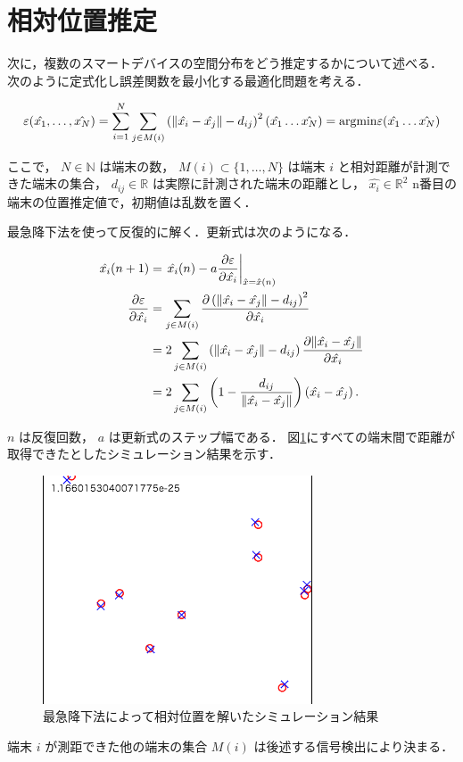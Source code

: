 

\section{相対位置推定}


次に，複数のスマートデバイスの空間分布をどう推定するかについて述べる．
次のように定式化し誤差関数を最小化する最適化問題を考える．

$$
\varepsilon(\hat{x_1}, \dots, \hat{x_N}) = \sum_{i=1}^N \sum_{j\in M(i)} \left( \| \hat{ x_i } - \hat{ x_j } \| - d_{ij} \right)^2 \\
(\hat{x_1} \dots \hat{x_N}) = \mathrm{argmin} \varepsilon(\hat{x_1} \dots \hat{x_N})
$$

ここで，
$N \in \mathbb{N}$ は端末の数，
$M(i) \subset \{1,\dots,N\}$ は端末 $i$ と相対距離が計測できた端末の集合，
$d_{ij} \in \mathbb{R}$ は実際に計測された端末の距離とし，
$\hat{ x_i } \in \mathbb{R}^2$ n番目の端末の位置推定値で，初期値は乱数を置く．

最急降下法を使って反復的に解く．更新式は次のようになる．

$$\begin{aligned}
\hat{x_i} (n + 1) & = \left. \hat{x_i} (n) - a \frac{\partial \varepsilon}{\partial \hat{x_i}} \right|_{\hat{x} = \hat{x}(n)} \\
\frac{\partial \varepsilon}{\partial \hat{x_i}}
&= \sum_{j\in M(i)} \frac{\partial \left( \|\hat{ x_i } - \hat{ x_j }\| - d_{ij} \right)^2}{\partial \hat{x_i}} \notag\\
&= 2 \sum_{j\in M(i)} \left( \| \hat{x_i} - \hat{x_j} \| - d_{ij} \right) \frac{\partial \| \hat{x_i} - \hat{x_j} \|}{\partial \hat{x_i}} \notag\\
&= 2 \sum_{j\in M(i)} \left( 1 - \frac{d_{ij}}{\| \hat{x_i} - \hat{x_j} \|} \right) \left( \hat{x_i} - \hat{x_j} \right).
\end{aligned}$$

$n$ は反復回数， $a$ は更新式のステップ幅である．
図\ref{fig:relpo_s}にすべての端末間で距離が取得できたとしたシミュレーション結果を示す．


\begin{figure}[p]\centering
  \hspace{-2mm}\includegraphics[clip,width=1.1\hsize]{img/positiondetection-new.png}
  \caption{最急降下法によって相対位置を解いたシミュレーション結果}\label{fig:relpo_s}
\end{figure}

端末 $i$ が測距できた他の端末の集合 $M(i)$ は後述する信号検出により決まる．

